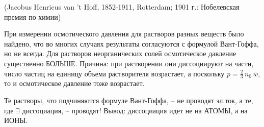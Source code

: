 \documentclass[12pt,epsfig,color,russian]{article}
\begin{document}
 (Jacobus Henricus van 't Hoff, 1852-1911, Rotterdam; 1901 г.: Нобелевская премия по химии)

 При измерении осмотического давления для растворов разных веществ было найдено, что во многих случаях результаты согласуются с формулой Вант-Гоффа, но не всегда. Для растворов неорганических солей осмоти\-чес\-кое давление существенно БОЛЬШЕ. Причина: при растворении они диссоциируют на части, число частиц на единицу объема растворителя возрастает, а поскольку  $p=\frac23\,n_0\,\overline{w}$, то и осмотическое давление тоже возрастает.

 Те растворы, что подчиняются формуле Вант-Гоффа, -- не проводят эл.ток, а те, где $\exists$ диссоциация, -- проводят! Вывод: диссоциация идет не на АТОМЫ, а на ИОНЫ.
\end{document}
